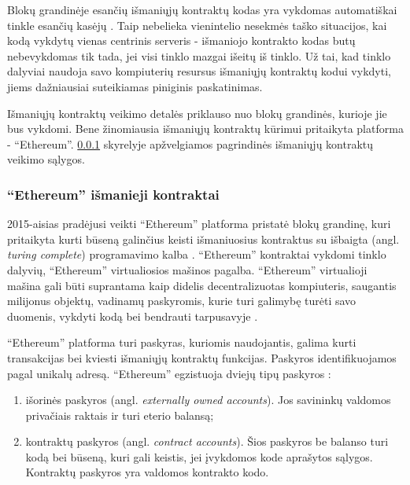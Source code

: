 Blokų grandinėje esančių išmaniųjų kontraktų kodas yra vykdomas automatiškai tinkle esančių kasėjų \cite{Zheng2017}.
Taip nebelieka vienintelio nesekmės taško situacijos, kai kodą vykdytų vienas centrinis serveris - išmaniojo kontrakto
kodas butų nebevykdomas tik tada, jei visi tinklo mazgai išeitų iš tinklo. Už tai, kad tinklo dalyviai naudoja savo kompiuterių
resursus išmaniųjų kontraktų kodui vykdyti, jiems dažniausiai suteikiamas piniginis paskatinimas.

Išmaniųjų kontraktų veikimo detalės priklauso nuo blokų grandinės, kurioje jie bus vykdomi.
Bene žinomiausia išmaniųjų kontraktų kūrimui pritaikyta platforma - \enquote{Ethereum}.
\hypertarget{section:ethereumIntro}{\ref{section:ethereumIntro}} skyrelyje apžvelgiamos pagrindinės išmaniųjų kontraktų
veikimo sąlygos.

\subsubsection{\enquote{Ethereum} išmanieji kontraktai} \label{section:ethereumIntro}

2015-aisias pradėjusi veikti \enquote{Ethereum} platforma pristatė blokų grandinę, kuri pritaikyta kurti būseną galinčius keisti
išmaniuosius kontraktus su išbaigta
(angl. \textit{turing complete}) programavimo kalba \cite{EthereumWhitePaper}. \enquote{Ethereum} kontraktai vykdomi tinklo
dalyvių, \enquote{Ethereum} virtualiosios mašinos pagalba.  \enquote{Ethereum} virtualioji mašina gali būti suprantama kaip didelis decentralizuotas
kompiuteris, saugantis milijonus objektų, vadinamų paskyromis, kurie turi galimybę turėti savo duomenis,
vykdyti kodą bei bendrauti tarpusavyje \cite{Ethereum}.

\enquote{Ethereum} platforma turi paskyras, kuriomis naudojantis, galima kurti transakcijas bei kviesti išmaniųjų
kontraktų funkcijas. Paskyros identifikuojamos pagal unikalų adresą. \enquote{Ethereum} egzistuoja dviejų tipų paskyros \cite{Ethereum}:

\begin{enumerate}
    \item išorinės paskyros (angl. \textit{externally owned accounts}). Jos savininkų valdomos privačiais raktais ir turi eterio
    balansą;
    \item kontraktų paskyros (angl. \textit{contract accounts}). Šios paskyros be balanso turi kodą bei būseną, kuri gali keistis,
    jei įvykdomos kode aprašytos sąlygos. Kontraktų paskyros yra valdomos kontrakto kodo.
\end{enumerate}

